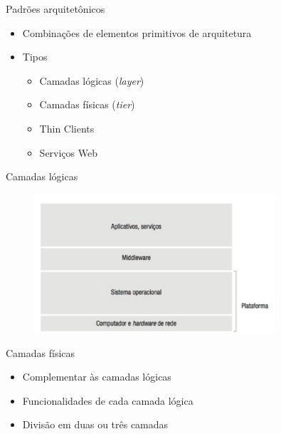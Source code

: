 \documentclass[aspectratio=169,
				xcolor=table]{beamer}
\begin{document}
	\begin{frame}{Padrões arquitetônicos}
		\begin{itemize}
			\item Combinações de elementos primitivos de arquitetura
			\vspace{1em}
			\item Tipos
			\begin{itemize}
				\item Camadas lógicas (\textit{layer})
				\item Camadas físicas (\textit{tier})
				\item Thin Clients
				\item Serviços Web
			\end{itemize}
		\end{itemize}
	\end{frame}
	
	\begin{frame}{Camadas lógicas}	
		\begin{figure}[hbtp]
		\centering
		\includegraphics[width=0.8\textwidth, keepaspectratio]{../figs/cap02/camadafisica.png}
		\end{figure}	
	\end{frame}
	
	\begin{frame}{Camadas físicas}
		\begin{itemize}
			\item Complementar às camadas lógicas
			\vspace{1em}
			\item Funcionalidades de cada camada lógica
			\vspace{1em}
			\item Divisão em duas ou três camadas
		\end{itemize}
	\end{frame}
	
\end{document}
